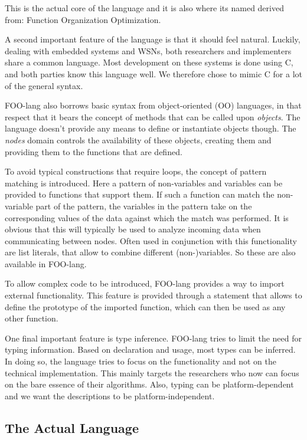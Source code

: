 \documentclass[conference]{IEEEtran}
\begin{document}
This is the actual core of the language and it is also where its named derived
from: Function Organization Optimization.

A second important feature of the language is that it should feel natural.
Luckily, dealing with embedded systems and WSNs, both researchers and
implementers share a common language. Most development on these systems is done
using C, and both parties know this language well. We therefore chose to mimic
C for a lot of the general syntax.

FOO-lang also borrows basic syntax from object-oriented (OO) languages, in that
respect that it bears the concept of methods that can be called upon
\emph{objects}. The language doesn't provide any means to define or instantiate
objects though. The \emph{nodes} domain controls the availability of these
objects, creating them and providing them to the functions that are defined.

To avoid typical constructions that require loops, the concept of pattern
matching is introduced. Here a pattern of non-variables and variables can be
provided to functions that support them. If such a function can match the
non-variable part of the pattern, the variables in the pattern take on the
corresponding values of the data against which the match was performed. It is
obvious that this will typically be used to analyze incoming data when
communicating between nodes. Often used in conjunction with this functionality
are list literals, that allow to combine different (non-)variables. So these
are also available in FOO-lang.

To allow complex code to be introduced, FOO-lang provides a way to import
external functionality. This feature is provided through a statement that
allows to define the prototype of the imported function, which can then be used
as any other function.

One final important feature is type inference. FOO-lang tries to limit the need
for typing information. Based on declaration and usage, most types can be
inferred. In doing so, the language tries to focus on the functionality and not
on the technical implementation. This mainly targets the researchers who now
can focus on the bare essence of their algorithms. Also, typing can be
platform-dependent and we want the descriptions to be platform-independent.

\subsection{The Actual Language}
\label{subsection:language}
\end{document}
